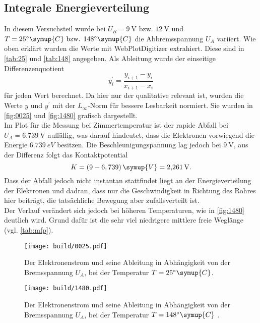 \subsection{Integrale Energieverteilung}
\label{sec:Integrale Energieverteilung}
In diesem Versuchsteil wurde bei $U_B = \SI{9}{\volt} \text{ bzw. } \SI{12}{\volt}$ und $T
= 25^\circ \symup{C} \text{ bzw. } 148^\circ \symup{C}$ die Abbremsspannung $U_A$
variiert. Wie oben erklärt wurden die Werte mit WebPlotDigitizer extrahiert. Diese sind in
\autoref{tab:25} und \autoref{tab:148} angegeben. Als Ableitung wurde der einseitige
Differenzenquotient
\[
	y^\prime_i = \frac{y_{i+1} - y_i}{x_{i+1} - x_i}
\]
für jeden Wert berechnet. Da hier nur der qualitative relevant ist, wurden die Werte $y$
und $y^\prime$ mit der $L_\infty$-Norm für bessere Lesbarkeit normiert. Sie wurden in
\autoref{fig:0025} und \autoref{fig:1480} grafisch dargestellt. 
\\
Im Plot für die Messung bei Zimmertemperatur ist der rapide Abfall bei $U_A =
\SI{6,739}{\volt}$ auffällig, was darauf hindeutet, dass die Elektronen vorwiegend die
Energie $\SI{6,739}{eV}$ besitzen. Die Beschleunigungspannung lag jedoch bei
$\SI{9}{\volt}$, aus der Differenz folgt das Kontaktpotential
\begin{equation}
	K = (9 - 6,739) \, \symup{V} = \SI{2.261}{\volt}.
\end{equation}
Dass der Abfall jedoch nicht instantan stattfindet liegt an der Energieverteilung der
Elektronen und dadran, dass nur die Geschwindigkeit in Richtung des Rohres hier beiträgt,
die tatsächliche Bewegung aber zufallsverteilt ist.
\\
Der Verlauf verändert sich jedoch bei höheren Temperaturen, wie in \autoref{fig:1480}
deutlich wird. Grund dafür ist die sehr viel niedrigere mittlere freie Weglänge (vgl.
\autoref{tab:mfp}).
\begin{figure}[H]
	\texttt{[image: build/0025.pdf]}
	\caption{Der Elektronenstrom und seine Ableitung in Abhängigkeit von der
	Bremsspannung $U_A$, bei der Temperatur $T=25^\circ \symup{C}$.}
	\label{fig:0025}
\end{figure}
\begin{figure}[H]
	\texttt{[image: build/1480.pdf]}
	\caption{Der Elektronenstrom und seine Ableitung in Abhängigkeit von der
	Bremsspannung $U_A$, bei der Temperatur $T=148^\circ \symup{C}$ .}
	\label{fig:1480}
\end{figure}

